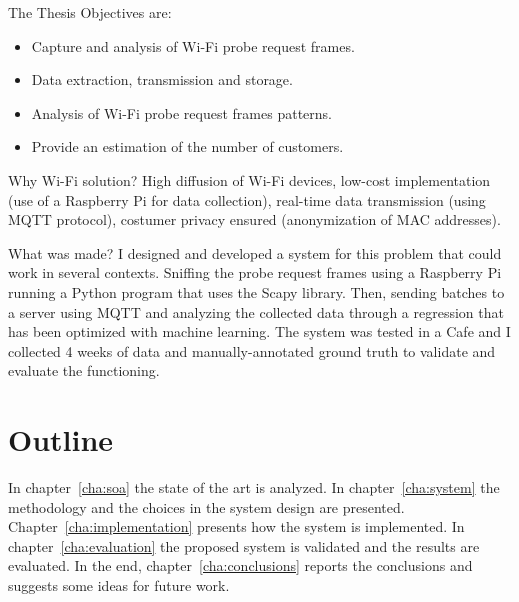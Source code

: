 The Thesis Objectives are:
\begin{itemize}
  \item Capture and analysis of Wi-Fi probe request frames.
  \item Data extraction, transmission and storage.
  \item Analysis of Wi-Fi probe request frames patterns.
  \item Provide an estimation of the number of customers.
\end{itemize}

Why Wi-Fi solution?
High diffusion of Wi-Fi devices, low-cost implementation (use of a Raspberry Pi for data collection), real-time data transmission (using MQTT protocol), costumer privacy ensured (anonymization of MAC addresses).

What was made?
I designed and developed a system for this problem that could work in several contexts.
Sniffing the probe request frames using a Raspberry Pi running a Python program that uses the Scapy library. Then, sending batches to a server using MQTT and analyzing the collected data through a regression that has been optimized with machine learning.
The system was tested in a Cafe and I collected 4 weeks of data and manually-annotated ground truth to validate and evaluate the functioning.


\section{Outline} 
\label{sec:outline}
\vspace{0.2 cm} 

In chapter~\ref{cha:soa} the state of the art is analyzed.
In chapter~\ref{cha:system} the methodology and the choices in the system design are presented.
Chapter~\ref{cha:implementation}  presents how the system is implemented.
In chapter~\ref{cha:evaluation} the proposed system is validated and the results are evaluated.
In the end, chapter~\ref{cha:conclusions} reports the conclusions and suggests some ideas for future work.
